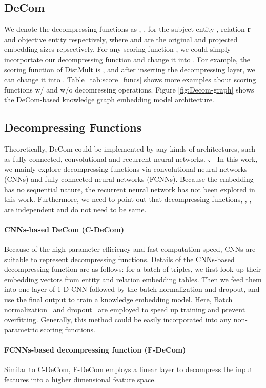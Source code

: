 \documentclass[letterpaper]{article} \usepackage{aaai20}  \usepackage{times}  \usepackage{helvet} \usepackage{courier}  \usepackage{booktabs}
\begin{document}
 \subsection{DeCom}
We denote the decompressing functions as , ,  for the subject entity , relation \textbf{r} and objective entity  respectively, where  and  are the original and projected embedding sizes repsectively. For any scoring function , we could simply incorportate our decompressing function and change it into . For example, the scoring function of DistMult is , and after inserting the decompressing layer, we can change it into . Table~\ref{tab:score_funcs} shows more examples about scoring functions w/ and w/o decomressing operations. Figure \ref{fig:Decom-graph} shows the DeCom-based knowledge graph embedding model architecture. 

\subsection{Decompressing Functions}

Theoretically, DeCom could be implemented by any kinds of architectures, such as fully-connected, convolutional and recurrent neural networks. 、 In this work, we mainly explore decompressing functions via convolutional neural networks (CNNs) and fully connected neural networks (FCNNs). 
Because the embedding has no sequential nature, the recurrent neural network has not been explored in this work. 
Furthermore, we need to point out that decompressing functions,  , ,  are independent and do not need to be same. 

\paragraph{CNNs-based DeCom (C-DeCom)}
Because of the high parameter efficiency and fast computation speed, CNNs are suitable to represent decompressing functions.
 Details of the CNNs-based decompressing function are as follows: for a batch of triples, we first look up their embedding vectors from entity and relation embedding tables. Then we feed them into one layer of 1-D CNN followed by the batch normalization and dropout, and use the final output to train a knowledge embedding model. Here, Batch normalization~\cite{ioffe2015batch} and dropout~\cite{srivastava2014dropout} are employed to speed up training and prevent overfitting. Generally, this method could be easily incorporated into any non-parametric scoring functions. 
 \paragraph{FCNNs-based decompressing function (F-DeCom)}
  Similar to C-DeCom, F-DeCom employs a linear layer to decompress the input features into a higher dimensional feature space.
\end{document}
